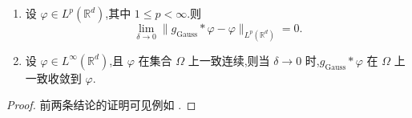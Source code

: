 \begin{lemma}[高斯滤波器的其他性质]
\label{lem:gaussian-filter-properties}
\begin{enumerate}[label=\roman*)]
 \item 设 $\varphi\in L^p(\mathbb{R}^d)$,其中 $1\le p<\infty$.则
 \begin{equation}\label{eq:gaussian-filter-approximate-identity}
  \lim_{\delta\to0}
   \|g_{\mathrm{Gauss}}*\varphi-\varphi\|_{L^p(\mathbb{R}^d)}=0.
 \end{equation}
 \item 设 $\varphi\in L^\infty(\mathbb{R}^d)$,且 $\varphi$ 在集合 $\Omega$ 上一致连续,则当 $\delta\to0$ 时,$g_{\mathrm{Gauss}}*\varphi$ 在 $\Omega$ 上一致收敛到 $\varphi$.
\end{enumerate}
\end{lemma}
\begin{proof}
前两条结论的证明可见例如 \textcite[Theorem~0.13]{Folland1995}.
\end{proof}



